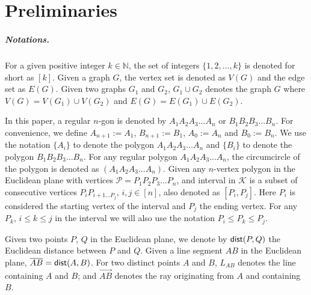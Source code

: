 
\section{Preliminaries}\label{sec:prelims}

\subparagraph{Notations.}
For a given positive integer $k \in \mathbb{N}$, the set of integers $\{1,2,\ldots,k\}$ is denoted for short as $[k]$. Given a graph $G$, the vertex set is denoted as $V(G)$ and the edge set as $E(G)$. Given two graphs $G_1$ and $G_2$, $G_1 \cup G_2$ denotes the graph $G$ where $V(G) = V(G_1) \cup V(G_2)$ and $E(G) = E(G_1) \cup E(G_2)$. 

In this paper, a regular $n$-gon is denoted by $A_1A_2A_3...A_n$ or $B_1B_2B_3...B_n$. For convenience, we define $A_{n + 1} := A_1$, $B_{n + 1} := B_1$, $A_0 := A_n$ and $B_0 := B_n$. We use the notation $\{A_i\}$ to denote the polygon $A_1A_2A_3 \ldots A_n$ and $\{B_i\}$ to denote the polygon $B_1B_2B_3 \ldots B_n$. For any regular polygon $A_1A_2A_3...A_n$, the circumcircle of the polygon is denoted as $(A_1A_2A_3...A_n)$. Given any $n$-vertex polygon in the Euclidean plane with vertices $\mathcal P = P_1P_2P_3\ldots P_n$, and interval in $\mathcal{K}$ is a subset of consecutive vertices $P_iP_{i+1\ldots P_j}$, $i,j\in [n]$, also denoted as $[P_i,P_j]$. Here $P_i$ is considered the starting vertex of the interval and $P_j$ the ending vertex. For any $P_k$, $i \leq k\leq j$ in the interval we will also use the notation $P_i \leq P_k \leq P_j$.

Given two points $P$, $Q$ in the Euclidean plane, we denote by ${\sf dist}(P,Q)$ the Euclidean distance between $P$ and $Q$. Given a line segment $AB$ in the Euclidean plane, $\overline{AB} = {\sf dist}(A,B)$. For two distinct points $A$ and $B$, $L_{AB}$ denotes the line containing $A$ and $B$; and $\overrightarrow{AB}$ denotes the ray originating from $A$ and containing $B$. 

